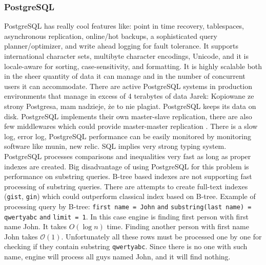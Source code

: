 \documentclass[10pt,a4paper]{article}
\newcommand{\jarek}[1]{\noindent\colorbox{myYellow}{Jarek: #1}}
\newcommand{\Oh}{\mathcal{O}}
\begin{document}
\subsubsection{PostgreSQL}
PostgreSQL has really cool features like: point in time recovery, tablespaces, asynchronous replication, online/hot backups, a sophisticated query planner/optimizer, and write ahead logging for fault tolerance. It supports international character sets, multibyte character encodings, Unicode, and it is locale-aware for sorting, case-sensitivity, and formatting. It is highly scalable both in the sheer quantity of data it can manage and in the number of concurrent users it can accommodate. There are active PostgreSQL systems in production environments that manage in excess of 4 terabytes of data \jarek{Kopiowane ze strony Postgresa, mam nadzieje, że to nie plagiat}.
PostgreSQL keeps its data on disk. PostgreSQL implements their own master-slave replication, there are also few middlewares which could provide master-master replication \cite{PSQLREPL}. There is a slow log, error log, PostgreSQL performance can be easily monitored by monitoring software like munin, new relic. SQL implies very strong typing system. PostgreSQL processes comparisons and inequalities very fast as long as proper indexes are created. Big disadvantage of using PostgreSQL for this problem is performance on substring queries. B-tree based indexes are not supporting fast processing of substring queries. There are attempts to create full-text indexes (\verb|gist|, \verb|gin|) which could outperform classical index based on B-tree.
Example of processing query by B-tree: \verb|first name = John| \verb|and| \verb|substring(last name) = qwertyabc| \verb|and| \verb|limit = 1|. In this case engine is finding first person with first name John. It takes $O(\log n)$ time. Finding another person with first name John takes $\Oh(1)$. Unfortunately all these rows must be processed one by one for checking if they contain substring \verb|qwertyabc|. Since there is no one with such name, engine will process all guys named John, and it will find nothing.
\end{document}

